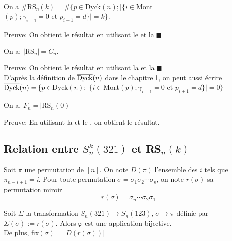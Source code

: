 \begin{corollaire}\label{SimNOfK} \text{ }\\
	On a $\#$\rm{RS}$_{n}(k) = \# \{p \in $\rm{Dyck}$(n); |\{i \in $\rm{Mont}$(p); \gamma_{i-1}=0 \text{ et } p_{i+1}=d\}|=k\}$.
\end{corollaire}
Preuve: On obtient le résultat  en utilisant le  et la  $\blacksquare$

\begin{corollaire}
	On a:  $|$\rm{RS}$_{n}|=C_{n}$.
\end{corollaire}
Preuve: On obtient le résultat en utilisant la  et la  $\blacksquare$\\
D'après la définition de  $\overline{\rm{Dyck}}(n)$ dans le chapitre 1,  on peut aussi écrire \\
$\overline{\rm{Dyck}}(n) = \{p \in $\rm{Dyck}$(n); |\{i \in $\rm{Mont}$(p); \gamma_{i-1}=0 \text{ et } p_{i+1}=d\}|=0\}$

\begin{corollaire} \label{fnToSRn0}
	\begin{rm}
		On a, $F_{n}=|$\rm{RS}$_{n}(0)|$
	\end{rm}
\end{corollaire}
Preuve: En utilisant la  et le  , on obtient le résultat.


\subsection{Relation entre $S_{n}^{k}(321)$ et \rm{RS}$_{n}(k)$}
\begin{definition}
	\begin{rm}
		Soit $\pi$ une permutation de $[n]$. On note $D(\pi)$ l'ensemble des $i$ tels que $\pi_{n-i+1}=i$. Pour toute permutation $\sigma=\sigma_{1}\sigma_{2}\cdots \sigma_{n}$, on note $r(\sigma)$ sa permutation miroir $$r(\sigma)=\sigma_{n}\cdots \sigma_{2}\sigma_{1}$$
	\end{rm}
\end{definition}

\begin{proposition} \label{SKNBij}
	Soit $\Sigma$ la transformation $S_{n}(321)\longrightarrow S_{n}(123)$, $\sigma \longrightarrow \pi$ définie par  $\Sigma(\sigma):= r(\sigma)$. Alors $\varphi$ est une application bijective.\\
	De plus, \rm{fix}$(\sigma)=|D(r(\sigma))|$
\end{proposition}

